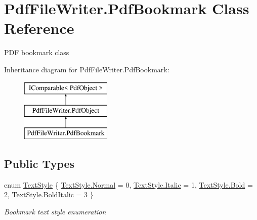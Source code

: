 \hypertarget{class_pdf_file_writer_1_1_pdf_bookmark}{}\section{Pdf\+File\+Writer.\+Pdf\+Bookmark Class Reference}
\label{class_pdf_file_writer_1_1_pdf_bookmark}


P\+DF bookmark class  


Inheritance diagram for Pdf\+File\+Writer.\+Pdf\+Bookmark\+:\begin{figure}[H]
\begin{center}
\leavevmode
\includegraphics[height=3.000000cm]{class_pdf_file_writer_1_1_pdf_bookmark}
\end{center}
\end{figure}
\subsection*{Public Types}
\begin{DoxyCompactItemize}
\item 
enum \hyperlink{class_pdf_file_writer_1_1_pdf_bookmark_aeeed840fb92fc3e01ed8152a6a8c537c}{Text\+Style} \{ \hyperlink{class_pdf_file_writer_1_1_pdf_bookmark_aeeed840fb92fc3e01ed8152a6a8c537ca960b44c579bc2f6818d2daaf9e4c16f0}{Text\+Style.\+Normal} = 0, 
\hyperlink{class_pdf_file_writer_1_1_pdf_bookmark_aeeed840fb92fc3e01ed8152a6a8c537ca1d874710ccdcd46b95397049d2e7500c}{Text\+Style.\+Italic} = 1, 
\hyperlink{class_pdf_file_writer_1_1_pdf_bookmark_aeeed840fb92fc3e01ed8152a6a8c537ca114c3050111d8b8ddd830b99ccebd246}{Text\+Style.\+Bold} = 2, 
\hyperlink{class_pdf_file_writer_1_1_pdf_bookmark_aeeed840fb92fc3e01ed8152a6a8c537ca1e8fb6e2ee37a07189ff20a09cb4d6d5}{Text\+Style.\+Bold\+Italic} = 3
 \}\begin{DoxyCompactList}\small\item\em Bookmark text style enumeration \end{DoxyCompactList}
\end{DoxyCompactItemize}
